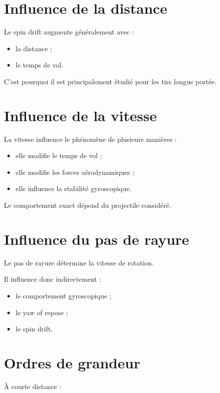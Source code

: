 \section{Influence de la distance}

Le spin drift augmente généralement avec :

\begin{itemize}
    \item la distance ;
    \item le temps de vol.
\end{itemize}

C'est pourquoi il est principalement étudié pour les tirs longue portée.

\section{Influence de la vitesse}

La vitesse influence le phénomène de plusieurs manières :

\begin{itemize}
    \item elle modifie le temps de vol ;
    \item elle modifie les forces aérodynamiques ;
    \item elle influence la stabilité gyroscopique.
\end{itemize}

Le comportement exact dépend du projectile considéré.

\section{Influence du pas de rayure}

Le pas de rayure détermine la vitesse de rotation.

Il influence donc indirectement :

\begin{itemize}
    \item le comportement gyroscopique ;
    \item le yaw of repose ;
    \item le spin drift.
\end{itemize}

\section{Ordres de grandeur}

À courte distance :

